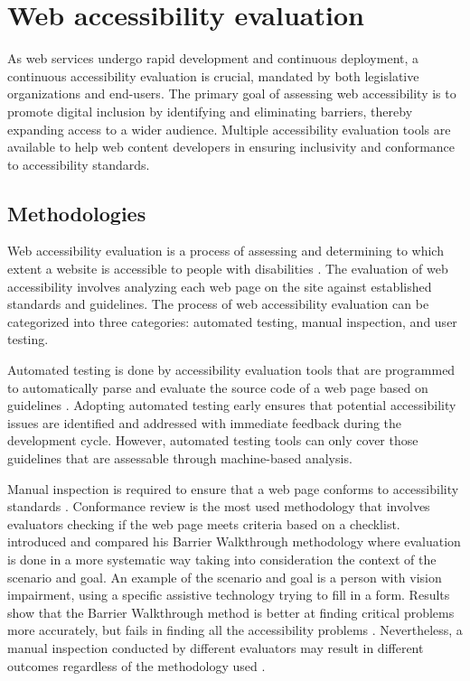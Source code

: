 \chapter{Web accessibility evaluation\label{accessibility_evaluation}}

As web services undergo rapid development and continuous deployment, a continuous accessibility evaluation is crucial, mandated by both legislative organizations and end-users. The primary goal of assessing web accessibility is to promote digital inclusion by identifying and eliminating barriers, thereby expanding access to a wider audience. Multiple accessibility evaluation tools are available to help web content developers in ensuring inclusivity and conformance to accessibility standards.

\section{Methodologies}

Web accessibility evaluation is a process of assessing and determining to which extent a website is accessible to people with disabilities \citep[Chapter~26.2]{webaccessibility}. The evaluation of web accessibility involves analyzing each web page on the site against established standards and guidelines. The process of web accessibility evaluation can be categorized into three categories: automated testing, manual inspection, and user testing.

Automated testing is done by accessibility evaluation tools that are programmed to automatically parse and evaluate the source code of a web page based on guidelines \citep[Chapter~26.2]{webaccessibility}. Adopting automated testing early ensures that potential accessibility issues are identified and addressed with immediate feedback during the development cycle. However, automated testing tools can only cover those guidelines that are assessable through machine-based analysis.

Manual inspection is required to ensure that a web page conforms to accessibility standards \citep[Chapter~26.2]{webaccessibility}. Conformance review is the most used methodology that involves evaluators checking if the web page meets criteria based on a checklist. \textcite{comparative_accessibility_methods} introduced and compared his Barrier Walkthrough methodology where evaluation is done in a more systematic way taking into consideration the context of the scenario and goal. An example of the scenario and goal is a person with vision impairment, using a specific assistive technology trying to fill in a form. Results show that the Barrier Walkthrough method is better at finding critical problems more accurately, but fails in finding all the accessibility problems \citep{comparative_accessibility_methods}. Nevertheless, a manual inspection conducted by different evaluators may result in different outcomes regardless of the methodology used \citep{accessibility_evaluation_experts, 10.1145/1878803.1878813_testability_expertise}. 


